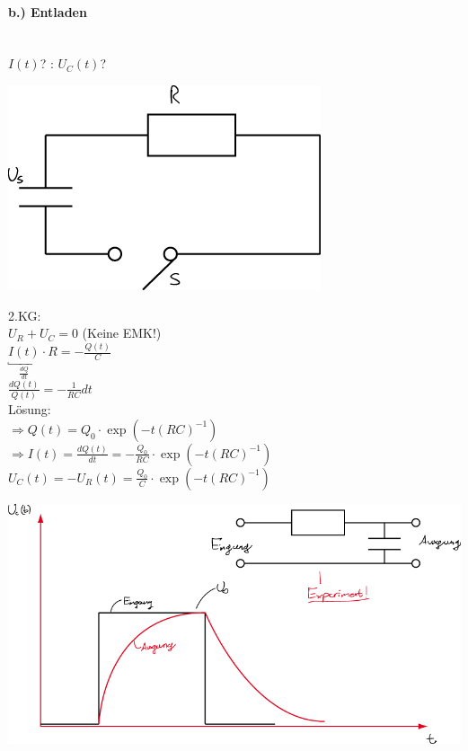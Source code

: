 \paragraph{b.) Entladen} \hfill \\
	$ I(t) $? : $ U_C(t) $? \\
	\begin{center}
		\includegraphics[width=0.4\linewidth]{skizzen/15/15_7/4}
	\end{center}

	2.KG: \\
	$ U_R + U_C = 0 $ (Keine EMK!)\\
	$ \underbracket{I(t)}_{\frac{dQ}{dt}} \cdot R = -\frac{Q(t)}{C} $ \\
	$ \frac{dQ(t)}{Q(t)} = -\frac{1}{RC} dt $ \\
	Lösung: \\
	$\Rightarrow  Q(t) = Q_0 \cdot \exp(-t(RC)^{-1}) $ \\
	$ \Rightarrow I(t) = \frac{dQ(t)}{dt} = -\frac{Q_0}{RC} \cdot \exp(-t(RC)^{-1}) $\\
	$ U_C(t) = -U_R(t) = \frac{Q_0}{C} \cdot \exp(-t(RC)^{-1}) $ \\
	\begin{center}
		\includegraphics[width=0.6\linewidth]{skizzen/15/15_7/5}
	\end{center}

		